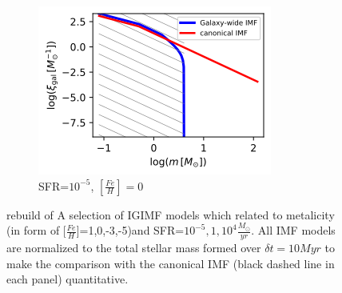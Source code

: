\begin{figure}
\begin{subfigure}[b]{0.45\textwidth}
	\includegraphics[width=\textwidth]{sfr1e-5-feh0.png}
	\caption{SFR=$10^{-5}$, $[\frac{Fe}{H}]=0$}
	\label{fig:2d-5dt}
	\end{subfigure}
	\caption{rebuild of A selection of IGIMF models which related to metalicity (in form of $[\frac{Fe}{H}$]=1,0,-3,-5)and SFR=$10^{-5},1,10^{4} \frac{M_{\odot}}{yr}$. All IMF models are
		normalized to the total stellar mass formed over $\delta t = 10 Myr$ to make the comparison with the canonical IMF (black dashed line in each panel)
		quantitative.}
	\label{fig:feh=0}
\end{figure}

